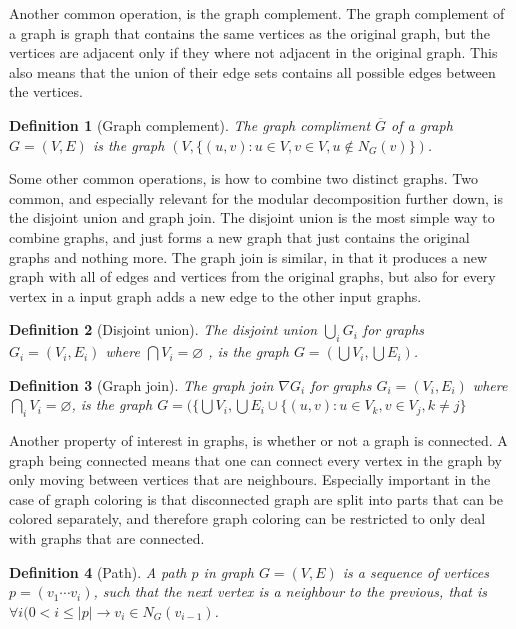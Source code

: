 \documentclass{amsart}
\newtheorem{definition}{Definition}[section]
\begin{document}
Another common operation, is the graph complement. The graph complement of a
graph is graph that contains the same vertices as the original graph, but the
vertices are adjacent only if they where not adjacent in the original graph.
This also means that the union of their edge sets contains all possible edges
between the vertices.

\begin{definition}[Graph complement]
    The graph compliment $\overline{G}$ of a graph $G = (V,E)$ is the graph 
    $(V,\{ (u,v) : u \in V,v \in V, u \notin N_G(v) \})$.
\end{definition}

Some other common operations, is how to combine two distinct graphs. Two common,
and especially relevant for the modular decomposition further down, is the
disjoint union and graph join. The disjoint union is the most simple way to
combine graphs, and just forms a new graph that just contains the original graphs
and nothing more. 
The graph join is similar, in that it produces a new graph with all of edges
and vertices from the original graphs, but also for every vertex in a
input graph adds a new edge to the other input graphs.

\begin{definition}[Disjoint union]
    The disjoint union $\bigcup_i G_i$ for graphs $G_i = (V_i,E_i)$ where 
    $\bigcap V_i = \varnothing $ , is the graph
    $G = \left( \bigcup V_i,\bigcup E_i \right)$.
\end{definition}

\begin{definition}[Graph join]
    The graph join $\nabla G_i$ for graphs $G_i = (V_i,E_i)$ where 
    $\bigcap_i V_i = \varnothing$, is the graph $G = (\{\bigcup V_i,
    \bigcup E_i \cup \{(u,v) : u \in V_k, v \in V_j, k \neq j \}$
\end{definition}


Another property of interest in graphs, is whether or not a graph is connected. A
graph being connected means that one can connect every vertex in the graph by
only moving between vertices that are neighbours. Especially important in the
case of graph coloring is that disconnected graph are split into parts that can
be colored separately, and therefore graph coloring can be restricted to only
deal with graphs that are connected.

\begin{definition}[Path]
    A path $p$ in graph $G = (V,E)$ is a sequence of vertices $p = (v_1\cdots
    v_i)$, such that the next vertex is a neighbour to the previous, 
    that is $\forall i(0 < i \leq |p| \to v_i \in N_G(v_{i-1})$.
\end{definition}
\end{document}
